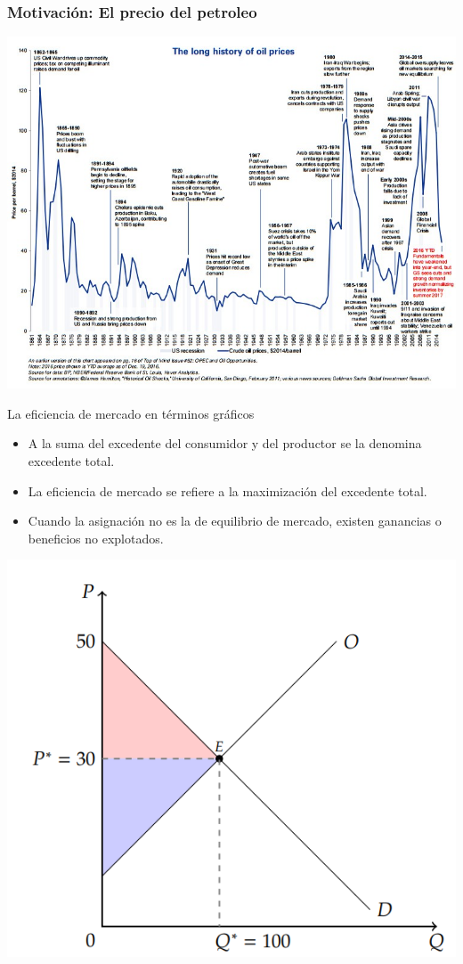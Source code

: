 \documentclass{beamer}
\begin{document}
\begin{frame}
    \frametitle{Motivación: El precio del petroleo}
    \centering
    \includegraphics[scale=0.35]{../Figures/Tema_04.01_new.jpg}
\end{frame} 

\begin{frame}{La eficiencia de mercado en términos gráficos}
    \begin{itemize}
      \item A la suma del excedente del consumidor y del productor se la denomina excedente total.
      \item La eficiencia de mercado se refiere a la maximización del excedente total.
      \item Cuando la asignación no es la de equilibrio de mercado, existen ganancias o beneficios no explotados.
    \end{itemize}
    \centering
    \includegraphics[scale=0.5]{../Figures/C17.9.png}
\end{frame}
\end{document}
